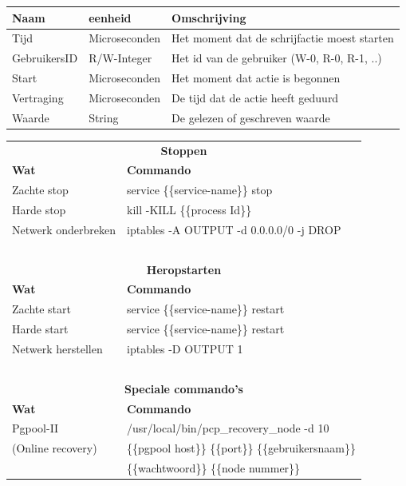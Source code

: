 \begin{table}[htbf]
\centering
		\begin{tabular}{l|l|l}
			\textbf{Naam} & \textbf{eenheid} & \textbf{Omschrijving} \\ 
			\hline Tijd & Microseconden & Het moment dat de schrijfactie moest starten\\ 
			GebruikersID & R/W-Integer & Het id van de gebruiker (W-0, R-0, R-1, ..) \\ 
			Start & Microseconden & Het moment dat actie is begonnen \\
			Vertraging & Microseconden & De tijd dat de actie heeft geduurd \\ 
			Waarde & String & De gelezen of geschreven waarde \\ 
		\end{tabular} 
	\label{table:consistentieuitvoer}
\end{table}

\begin{table}[htbf]
	\centering
		\begin{tabular}{l|l}
			\multicolumn{2}{c}{\textbf{Stoppen}} \\
			\textbf{Wat} & \textbf{Commando} \\ 
			\hline
			Zachte stop & service \{\{service-name\}\} stop \\ 
			Harde stop & kill -KILL \{\{process Id\}\} \\ 
			Netwerk onderbreken & iptables -A OUTPUT -d 0.0.0.0/0 -j DROP  \\ 
			\multicolumn{2}{c}{~} \\
			\multicolumn{2}{c}{\textbf{Heropstarten}} \\
			\textbf{Wat} & \textbf{Commando} \\ 
			\hline
			Zachte start & service \{\{service-name\}\} restart \\ 
			Harde start & service \{\{service-name\}\} restart \\ 
			Netwerk herstellen & iptables -D OUTPUT 1  \\ 
			\multicolumn{2}{c}{~}  \\
			\multicolumn{2}{c}{\textbf{Speciale commando's}} \\
			\textbf{Wat} & \textbf{Commando} \\ 
			\hline
			Pgpool-II & /usr/local/bin/pcp\_recovery\_node -d 10 \\
			\hspace*{0.5cm} (Online recovery) &  \hspace*{0.5cm} \{\{pgpool host\}\} \{\{port\}\} \{\{gebruikersnaam\}\} \\
			& \hspace*{0.5cm} \{\{wachtwoord\}\}  \{\{node nummer\}\}
		\end{tabular} 
	\label{table:beschikbaarheidstesten-commandos}
\end{table}